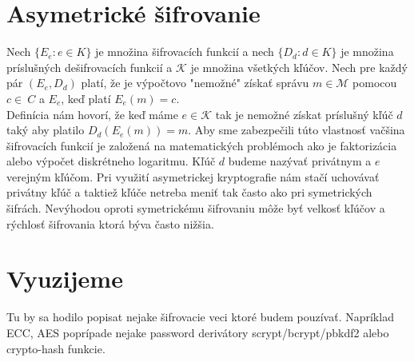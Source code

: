 \section{Asymetrické šifrovanie}
	Nech $\{E_e : e \in K\}$ je množina šifrovacích funkcií a nech  $\{D_d : d \in K\}$ je množina príslušných dešifrovacích funkcií a $\mathcal K$ je množina všetkých kľúčov. Nech pre každý pár $(E_e,D_d)$ platí, že je výpočtovo "nemožné" získať správu $m \in\mathcal M$ pomocou $c \in\	 C$ a $E_e$, keď platí $E_e(m) = c$. 
	\\Definícia nám hovorí, že keď máme $e \in\mathcal K$ tak je nemožné získat príslušný kľúč $d$ taký aby platilo $D_d(E_e(m)) = m$. Aby sme zabezpečili túto vlastnosť vačšina šifrovacích funkcií je založená na matematických problémoch ako je faktorizácia alebo výpočet diskrétneho logaritmu. Kľúč $d$ budeme nazývať privátnym a $e$ verejným kľúčom. Pri využití asymetrickej kryptografie nám stačí uchovávať privátny kľúč a taktiež kľúče netreba meniť tak často ako pri symetrických šifrách. Nevýhodou oproti symetrickému šifrovaniu môže byť velkosť kľúčov a rýchlosť šifrovania ktorá býva často nižšia.	
	
\section{Vyuzijeme}
Tu by sa hodilo popisat nejake šifrovacie veci ktoré budem pouzívať. Napríklad ECC, AES poprípade nejake password derivátory scrypt/bcrypt/pbkdf2 alebo crypto-hash funkcie.
		
